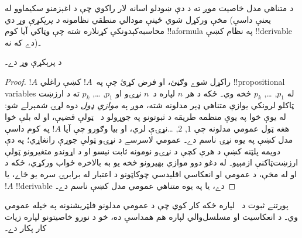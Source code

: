 \documentclass[../../../include/open-logic-section]{subfiles}
\begin{document}

د متناهي مدل خاصيت موږ ته د دې ښودلو اسانه لار راکوي چې د اغېزمنو سکيماوو
له مخې ورکړل شوي ځينې مودالي منطقي نظامونه \emph{د پرېکړې وړ} دي (يعنې
داسې محاسبه‌کېدونکې کړنلاره شته چې وټاکي آيا کوم !!a{formula} په
نظام کښې !!{derivable} دے که نه)۔

\begin{thm}
   د پرېکړې وړ دے۔
\end{thm}

\begin{proof}
  $!A$ راکړل شوے وګڼئ، او فرض کړئ چې په~$!A$ کښې راغلي
  !!{propositional variable}s له $p_1$, \dots, $p_k$ څخه وي۔ ځکه
  د هر $n$ لپاره د~$n$ نړۍو او $p_1$, \dots, $p_k$ ته د
  ارزښت ټاکلو لرونکي يوازې متناهي ډېر مدلونه شته، موږ په
  \emph{موازي ډول} دوه لړۍ شمېرلے شو: له يوې خوا په يوې منظمه
  طريقه د ثبوتونو په جوړولو د~ ټولې قضيې، او له بلې خوا
  هغه ټول عمومي مدلونه چې $1$, $2$, \dots نړۍې لري، او بيا
  وګورو چې آيا $!A$ په کوم داسې مدل کښې په يوه نړۍ ناسم دے۔
  عمومي لاسرسے د نړۍو ټولې جوړې رانغاړي؛ په دې دويمه پلټنه
  کښې د هرې کچې د نړۍو نومونه ثابت نيسو او د اړوندو متغيرونو
  ټولې ارزښت‌ټاکنې ازمېيو۔
  له دغو دوو موازي بهيرونو څخه يو به بالاخره ځواب ورکړي، ځکه د
   او
   له مخې، د عمومي او انعکاسي اقليدسي
  چوکاټونو د اعتبار له برابرۍ سره يو ځاے، يا $!A$ !!{derivable} دے، يا
  په يوه متناهي عمومي مدل کښې ناسم دے۔
\end{proof}

پورتنے ثبوت د~ لپاره ځکه کار کوي چې د عمومي مدلونو
فلټريشنونه په خپله عمومي وي۔ د انعکاسيت او مسلسل‌والي لپاره هم
همداسې ده، خو د نورو خاصيتونو لپاره زيات کار پکار دے۔
\end{document}
